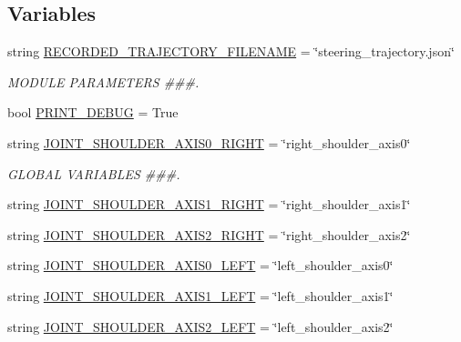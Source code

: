 \subsection*{Variables}
\begin{DoxyCompactItemize}
\item 
string \mbox{\hyperlink{namespaceinterpolate__steering_ab32491497a86b033f9fc14ec98e0d755}{R\+E\+C\+O\+R\+D\+E\+D\+\_\+\+T\+R\+A\+J\+E\+C\+T\+O\+R\+Y\+\_\+\+F\+I\+L\+E\+N\+A\+ME}} = \char`\"{}steering\+\_\+trajectory.\+json\char`\"{}
\begin{DoxyCompactList}\small\item\em M\+O\+D\+U\+LE P\+A\+R\+A\+M\+E\+T\+E\+RS \#\#\#. \end{DoxyCompactList}\item 
bool \mbox{\hyperlink{namespaceinterpolate__steering_aa9294fc90e09fb8e160b3c9118b974cf}{P\+R\+I\+N\+T\+\_\+\+D\+E\+B\+UG}} = True
\item 
string \mbox{\hyperlink{namespaceinterpolate__steering_af431c30e8c512206ee50add5d0c45016}{J\+O\+I\+N\+T\+\_\+\+S\+H\+O\+U\+L\+D\+E\+R\+\_\+\+A\+X\+I\+S0\+\_\+\+R\+I\+G\+HT}} = \char`\"{}right\+\_\+shoulder\+\_\+axis0\char`\"{}
\begin{DoxyCompactList}\small\item\em G\+L\+O\+B\+AL V\+A\+R\+I\+A\+B\+L\+ES \#\#\#. \end{DoxyCompactList}\item 
string \mbox{\hyperlink{namespaceinterpolate__steering_a8a6109418d5b040728f8a4d4af5fdeb2}{J\+O\+I\+N\+T\+\_\+\+S\+H\+O\+U\+L\+D\+E\+R\+\_\+\+A\+X\+I\+S1\+\_\+\+R\+I\+G\+HT}} = \char`\"{}right\+\_\+shoulder\+\_\+axis1\char`\"{}
\item 
string \mbox{\hyperlink{namespaceinterpolate__steering_a04d5bfddee8327b615a3b189e40b1f30}{J\+O\+I\+N\+T\+\_\+\+S\+H\+O\+U\+L\+D\+E\+R\+\_\+\+A\+X\+I\+S2\+\_\+\+R\+I\+G\+HT}} = \char`\"{}right\+\_\+shoulder\+\_\+axis2\char`\"{}
\item 
string \mbox{\hyperlink{namespaceinterpolate__steering_a47d226f9a659cddee4a6077ca84dde32}{J\+O\+I\+N\+T\+\_\+\+S\+H\+O\+U\+L\+D\+E\+R\+\_\+\+A\+X\+I\+S0\+\_\+\+L\+E\+FT}} = \char`\"{}left\+\_\+shoulder\+\_\+axis0\char`\"{}
\item 
string \mbox{\hyperlink{namespaceinterpolate__steering_a3bee1c18b0c5a9f78d1a97955e379768}{J\+O\+I\+N\+T\+\_\+\+S\+H\+O\+U\+L\+D\+E\+R\+\_\+\+A\+X\+I\+S1\+\_\+\+L\+E\+FT}} = \char`\"{}left\+\_\+shoulder\+\_\+axis1\char`\"{}
\item 
string \mbox{\hyperlink{namespaceinterpolate__steering_a26fca4cccde21c0a5bd1b74a931b5120}{J\+O\+I\+N\+T\+\_\+\+S\+H\+O\+U\+L\+D\+E\+R\+\_\+\+A\+X\+I\+S2\+\_\+\+L\+E\+FT}} = \char`\"{}left\+\_\+shoulder\+\_\+axis2\char`\"{}

\end{DoxyCompactItemize}
